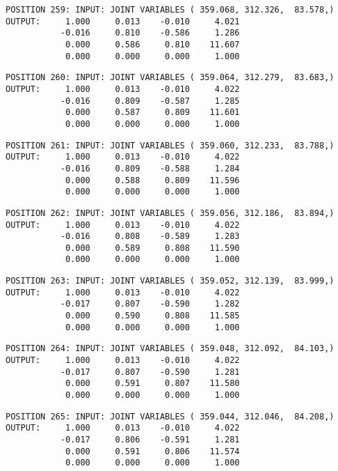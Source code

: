 \begin{verbatim}
POSITION 259: INPUT: JOINT VARIABLES ( 359.068, 312.326,  83.578,)
OUTPUT:     1.000     0.013    -0.010     4.021
           -0.016     0.810    -0.586     1.286
            0.000     0.586     0.810    11.607
            0.000     0.000     0.000     1.000
\end{verbatim} \pagebreak[1]\begin{verbatim}
POSITION 260: INPUT: JOINT VARIABLES ( 359.064, 312.279,  83.683,)
OUTPUT:     1.000     0.013    -0.010     4.022
           -0.016     0.809    -0.587     1.285
            0.000     0.587     0.809    11.601
            0.000     0.000     0.000     1.000
\end{verbatim} \pagebreak[1]\begin{verbatim}
POSITION 261: INPUT: JOINT VARIABLES ( 359.060, 312.233,  83.788,)
OUTPUT:     1.000     0.013    -0.010     4.022
           -0.016     0.809    -0.588     1.284
            0.000     0.588     0.809    11.596
            0.000     0.000     0.000     1.000
\end{verbatim} \pagebreak[1]\begin{verbatim}
POSITION 262: INPUT: JOINT VARIABLES ( 359.056, 312.186,  83.894,)
OUTPUT:     1.000     0.013    -0.010     4.022
           -0.016     0.808    -0.589     1.283
            0.000     0.589     0.808    11.590
            0.000     0.000     0.000     1.000
\end{verbatim} \pagebreak[1]\begin{verbatim}
POSITION 263: INPUT: JOINT VARIABLES ( 359.052, 312.139,  83.999,)
OUTPUT:     1.000     0.013    -0.010     4.022
           -0.017     0.807    -0.590     1.282
            0.000     0.590     0.808    11.585
            0.000     0.000     0.000     1.000
\end{verbatim} \pagebreak[1]\begin{verbatim}
POSITION 264: INPUT: JOINT VARIABLES ( 359.048, 312.092,  84.103,)
OUTPUT:     1.000     0.013    -0.010     4.022
           -0.017     0.807    -0.590     1.281
            0.000     0.591     0.807    11.580
            0.000     0.000     0.000     1.000
\end{verbatim} \pagebreak[1]\begin{verbatim}
POSITION 265: INPUT: JOINT VARIABLES ( 359.044, 312.046,  84.208,)
OUTPUT:     1.000     0.013    -0.010     4.022
           -0.017     0.806    -0.591     1.281
            0.000     0.591     0.806    11.574
            0.000     0.000     0.000     1.000
\end{verbatim} \pagebreak[1]\begin{verbatim}

\end{verbatim}
